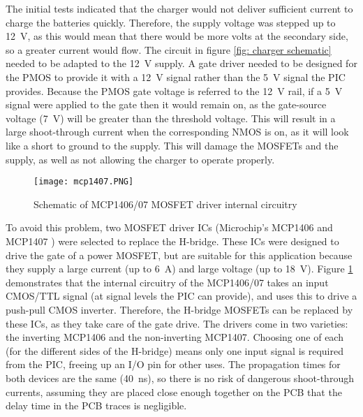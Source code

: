 

The initial tests indicated that the charger would not deliver sufficient current to charge the batteries quickly. Therefore, the supply voltage was stepped up to \SI{12}{\volt}, as this would mean that there would be more volts at the secondary side, so a greater current would flow. The circuit in figure \ref{fig: charger schematic} needed to be adapted to the \SI{12}{\volt} supply. A gate driver needed to be designed for the PMOS to provide it with a \SI{12}{\volt} signal rather than the \SI{5}{\volt} signal the PIC provides. Because the PMOS gate voltage is referred to the \SI{12}{\volt} rail, if a \SI{5}{\volt} signal were applied to the gate then it would remain on, as the gate-source voltage (\SI{7}{\volt}) will be greater than the threshold voltage. This will result in a large shoot-through current when the corresponding NMOS is on, as it will look like a short to ground to the supply. This will damage the MOSFETs and the supply, as well as not allowing the charger to operate properly. \\

\begin{figure}[htbp]
	\centering
	\texttt{[image: mcp1407.PNG]}
	\caption{Schematic of MCP1406/07 MOSFET driver internal circuitry \cite{mcp1407}}
	\label{fig: mcp1407}
\end{figure}

To avoid this problem, two MOSFET driver ICs (Microchip's MCP1406 and MCP1407 \cite{mcp1407}) were selected to replace the H-bridge. These ICs were designed to drive the gate of a power MOSFET, but are suitable for this application because they supply a large current (up to \SI{6}{\ampere}) and large voltage (up to \SI{18}{\volt}). Figure \ref{fig: mcp1407} demonstrates that the internal circuitry of the MCP1406/07 takes an input CMOS/TTL signal (at signal levels the PIC can provide), and uses this to drive a push-pull CMOS inverter. Therefore, the H-bridge MOSFETs can be replaced by these ICs, as they take care of the gate drive. The drivers come in two varieties: the inverting MCP1406 and the non-inverting MCP1407. Choosing one of each (for the different sides of the H-bridge) means only one input signal is required from the PIC, freeing up an I/O pin for other uses. The propagation times for both devices are the same (\SI{40}{\nano\second}), so there is no risk of dangerous shoot-through currents, assuming they are placed close enough together on the PCB that the delay time in the PCB traces is negligible.\\

